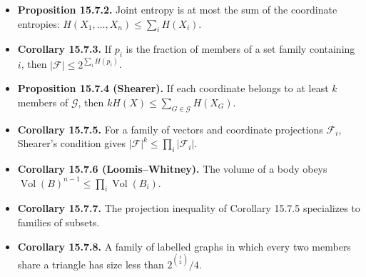 \documentclass[10pt]{article}
\newcommand{\1}{\mathbf 1}
\begin{document}
\begin{itemize}
conditioning.
\item \textbf{Proposition 15.7.2.} Joint entropy is at most the sum of the
coordinate entropies: $H(X_1,\ldots,X_n)\leq\sum_iH(X_i)$.
\item \textbf{Corollary 15.7.3.} If $p_i$ is the fraction of members of a set
family containing $i$, then
$|\mathcal F|\leq2^{\sum_iH(p_i)}$.
\item \textbf{Proposition 15.7.4 (Shearer).} If each coordinate belongs to at
least $k$ members of $\mathcal G$, then
$kH(X)\leq\sum_{G\in\mathcal G}H(X_G)$.
\item \textbf{Corollary 15.7.5.} For a family of vectors and coordinate
projections $\mathcal F_i$, Shearer's condition gives
$|\mathcal F|^k\leq\prod_i|\mathcal F_i|$.
\item \textbf{Corollary 15.7.6 (Loomis--Whitney).} The volume of a body obeys
$\operatorname{Vol}(B)^{n-1}\leq\prod_i\operatorname{Vol}(B_i)$.
\item \textbf{Corollary 15.7.7.} The projection inequality of Corollary 15.7.5
specializes to families of subsets.
\item \textbf{Corollary 15.7.8.} A family of labelled graphs in which every two
members share a triangle has size less than
$2^{\binom t2}/4$.
\end{itemize}
\end{document}
